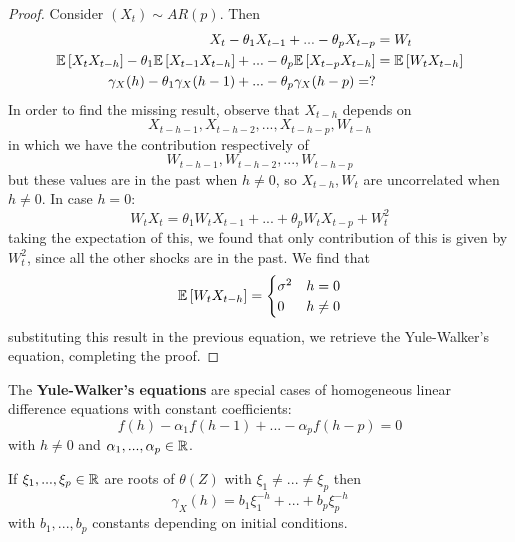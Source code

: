 \begin{proof}
    Consider $(X_t)\sim AR(p)$. Then
    \begin{equation*}
        \begin{split}
            X_t-\theta_1X_{t-1}+...-\theta_pX_{t-p}&=W_t\\
            \mathbb{E}\left[X_tX_{t-h}\right]-\theta_1\mathbb{E}\left[X_{t-1}X_{t-h}\right]+...-\theta_p\mathbb{E}\left[X_{t-p}X_{t-h}\right]&=\mathbb{E}\left[W_tX_{t-h}\right]\\
            \gamma_X(h)-\theta_1\gamma_X(h-1)+...-\theta_p\gamma_X(h-p)=?
        \end{split}
    \end{equation*}
    In order to find the missing result, observe that $X_{t-h}$ depends on
    \[
        X_{t-h-1},X_{t-h-2},...,X_{t-h-p},W_{t-h}  
    \]
    in which we have the contribution respectively of
    \[
        W_{t-h-1},W_{t-h-2},...,W_{t-h-p}  
    \]
    but these values are in the past when $h\ne0$, so $X_{t-h},W_t$ are uncorrelated when $h\ne0$. In case $h=0$:
    \[
        W_tX_t=\theta_1W_tX_{t-1}+...+\theta_pW_tX_{t-p}+W_t^2  
    \]
    taking the expectation of this, we found that only contribution of this is given by $W_t^2$, since all the other shocks are in the past. We find that
    \[
        \mathbb{E}\left[W_tX_{t-h}\right]=
        \begin{cases}
            \sigma^2&h=0\\
            0&h\ne0\\
        \end{cases}  
    \]
    substituting this result in the previous equation, we retrieve the Yule-Walker's equation, completing the proof.
\end{proof}

The \textbf{Yule-Walker's equations} are special cases of homogeneous linear difference equations  with constant coefficients:
\[
f(h)-\alpha_1f(h-1)+...-\alpha_pf(h-p)=0  
\]
with $h\ne0$ and $\alpha_1,...,\alpha_p\in\mathbb{R}$.

\begin{example}
    If $\xi_1,...,\xi_p\in\mathbb{R}$ are roots of $\theta(Z)$ with $\xi_1\ne...\ne\xi_p$ then
    \[
          \gamma_X(h)=b_1\xi_1^{-h}+...+b_p\xi_p^{-h}
    \]
    with $b_1,...,b_p$ constants depending on initial conditions.
\end{example}


